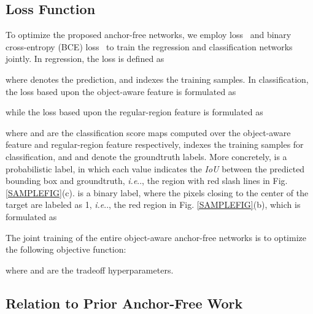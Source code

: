 \documentclass[runningheads]{llncs}
\makeatletter
\DeclareRobustCommand\onedot{\futurelet\@let@token\@onedot}
\def\@onedot{\ifx\@let@token.\else.\null\fi\xspace}
\def\ie{\emph{i.e}\onedot} \def\Ie{\emph{I.e}\onedot}
\makeatother
\begin{document}
\vspace{-0.5em}
\subsection{Loss Function}
\vspace{-0.3em}
To optimize the proposed anchor-free networks, we employ  loss~\cite{Unitbox} and binary cross-entropy (BCE) loss~\cite{CrossEntropy} to train the regression and classification networks jointly. In regression, the loss is defined as

where  denotes the prediction, and  indexes the training samples. In classification, the loss  based upon the object-aware feature  is formulated as

while the loss  based upon the regular-region feature  is formulated as

where  and  are the classification score maps computed over the object-aware feature and regular-region feature respectively,  indexes the training samples for classification, and  and  denote the groundtruth labels. More concretely,  is a probabilistic label, in which each value indicates the \textit{IoU} between the predicted bounding box and groundtruth, \ie, the region with red slash lines in Fig. \ref{SAMPLEFIG}(c).   is a binary label, where the pixels closing to the center of the target are labeled as 1, \ie, the red region in Fig. \ref{SAMPLEFIG}(b), which is formulated as




The joint training of the entire object-aware anchor-free networks is to optimize the following objective function:

where  and  are the tradeoff hyperparameters.

\vspace{-0.7em}
\subsection{Relation to Prior Anchor-Free Work} \label{Sec3.4}
\vspace{-0.3em}
 
\end{document}
